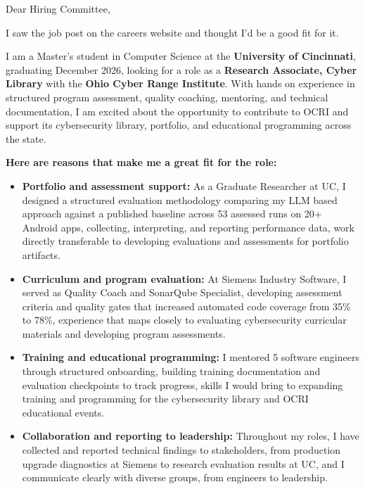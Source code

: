 \documentclass[11pt]{letter}
\date{}
\begin{document}
\begin{letter}{}

\opening{Dear Hiring Committee,}

I saw the job post on the careers website and thought I'd be a good fit for it.

I am a Master's student in Computer Science at the \textbf{University of Cincinnati}, graduating December 2026, looking for a role as a \textbf{Research Associate, Cyber Library} with the \textbf{Ohio Cyber Range Institute}. With hands on experience in structured program assessment, quality coaching, mentoring, and technical documentation, I am excited about the opportunity to contribute to OCRI and support its cybersecurity library, portfolio, and educational programming across the state.

\textbf{Here are reasons that make me a great fit for the role:}

\begin{itemize}[leftmargin=*, itemsep=0.45em]
    \item \textbf{Portfolio and assessment support:} As a Graduate Researcher at UC, I designed a structured evaluation methodology comparing my LLM based approach against a published baseline across 53 assessed runs on 20+ Android apps, collecting, interpreting, and reporting performance data, work directly transferable to developing evaluations and assessments for portfolio artifacts.

    \item \textbf{Curriculum and program evaluation:} At Siemens Industry Software, I served as Quality Coach and SonarQube Specialist, developing assessment criteria and quality gates that increased automated code coverage from 35\% to 78\%, experience that maps closely to evaluating cybersecurity curricular materials and developing program assessments.

    \item \textbf{Training and educational programming:} I mentored 5 software engineers through structured onboarding, building training documentation and evaluation checkpoints to track progress, skills I would bring to expanding training and programming for the cybersecurity library and OCRI educational events.

    \item \textbf{Collaboration and reporting to leadership:} Throughout my roles, I have collected and reported technical findings to stakeholders, from production upgrade diagnostics at Siemens to research evaluation results at UC, and I communicate clearly with diverse groups, from engineers to leadership.
\end{itemize}


\end{letter}
\end{document}
